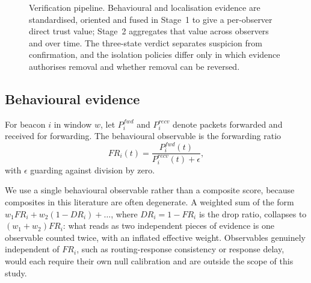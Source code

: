 \begin{figure}[!t]
\caption{Verification pipeline. Behavioural and localisation evidence are
standardised, oriented and fused in Stage~1 to give a per-observer direct
trust value; Stage~2 aggregates that value across observers and over time.
The three-state verdict separates suspicion from confirmation, and the
isolation policies differ only in which evidence authorises removal and
whether removal can be reversed.}
\label{fig:pipeline}
\end{figure}

\subsection{Behavioural evidence}

For beacon $i$ in window $w$, let $P_i^{fwd}$ and $P_i^{recv}$ denote packets
forwarded and received for forwarding. The behavioural observable is the
forwarding ratio
\begin{equation}
\label{eq:fr}
FR_i(t) = \frac{P_i^{fwd}(t)}{P_i^{recv}(t) + \epsilon},
\end{equation}
with $\epsilon$ guarding against division by zero.

We use a single behavioural observable rather than a composite score, because
composites in this literature are often degenerate. A weighted sum of the
form $w_1 FR_i + w_2(1-DR_i) + \dots$, where $DR_i = 1 - FR_i$ is the drop
ratio, collapses to $(w_1 + w_2) FR_i$: what reads as two independent pieces
of evidence is one observable counted twice, with an inflated effective
weight. Observables genuinely independent of $FR_i$, such as routing-response
consistency or response delay, would each require their own null calibration
and are outside the scope of this study.

